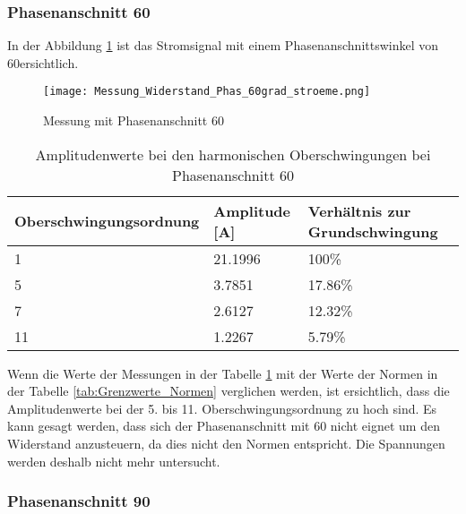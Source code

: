 \subsubsection*{Phasenanschnitt 60\textdegree}

In der Abbildung \ref{fig:Mess_Widerstand_Phas_60grad_stroeme} ist das Stromsignal mit einem Phasenanschnittswinkel von 60\textdegree ersichtlich. 

\begin{figure}[ht!]
	\centering
	\texttt{[image: Messung\_Widerstand\_Phas\_60grad\_stroeme.png]}	
	\caption{Messung mit Phasenanschnitt 60\textdegree}\label{fig:Mess_Widerstand_Phas_60grad_stroeme}
\end{figure}


\begin{table}[ht!]
	\centering
	\begin{tabular}{|l|l|l|}
		\hline
		Oberschwingungsordnung & Amplitude [A] 	& Verhältnis zur Grundschwingung	\\ \hline
		1                      & 21.1996   		& 100\%								\\ \hline
		5                      & 3.7851    		& 17.86\%							\\ \hline
		7                      & 2.6127    		& 12.32\%							\\ \hline
		11                     & 1.2267    		& 5.79\%							\\ \hline
	\end{tabular}
	\caption{Amplitudenwerte bei den harmonischen Oberschwingungen bei Phasenanschnitt 60\textdegree}\label{tab:Phas_60_Stroeme}
\end{table}

Wenn die Werte der Messungen in der Tabelle \ref{tab:Phas_60_Stroeme} mit der Werte der Normen in der Tabelle \ref{tab:Grenzwerte_Normen} verglichen werden, ist ersichtlich, dass die Amplitudenwerte bei der 5. bis 11. Oberschwingungsordnung zu hoch sind. Es kann gesagt werden, dass sich der Phasenanschnitt mit 60\textdegree \hspace{0.02cm} nicht eignet um den Widerstand anzusteuern, da dies nicht den Normen entspricht. Die Spannungen werden deshalb nicht mehr untersucht. 


\subsubsection*{Phasenanschnitt 90\textdegree}

